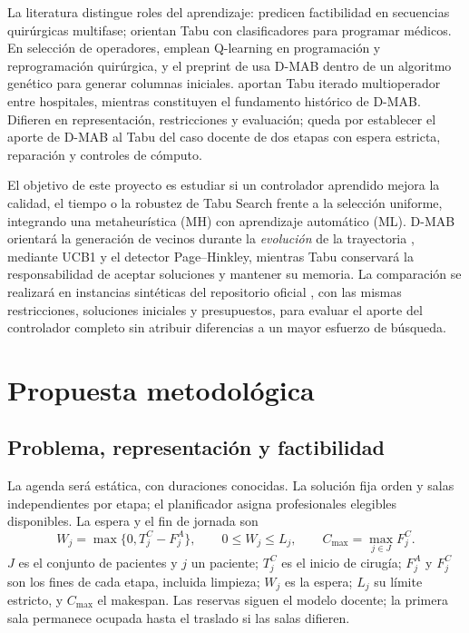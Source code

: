 \documentclass[12pt,letterpaper]{report}
\begin{document}
La literatura distingue roles del aprendizaje: \textcite{akbarzadeh2024}
predicen factibilidad en secuencias quirúrgicas multifase;
\textcite{niroumandrad2024} orientan Tabu con clasificadores para programar
médicos. En selección de operadores, \textcite{yu2024} emplean Q-learning
en programación y reprogramación quirúrgica, y el preprint de
\textcite{dolatkhah2026} usa D-MAB dentro de un algoritmo genético para
generar columnas iniciales. \textcite{yin2026} aportan Tabu iterado
multioperador entre hospitales, mientras \textcite{dacosta2008} constituyen
el fundamento histórico de D-MAB. Difieren en representación, restricciones
y evaluación; queda por establecer el aporte de D-MAB al Tabu del caso
docente de dos etapas con espera estricta, reparación y controles de cómputo.

El objetivo de este proyecto es estudiar si un controlador aprendido mejora
la calidad, el tiempo o la robustez de Tabu Search frente a la selección
uniforme, integrando una metaheurística (MH) con aprendizaje automático (ML).
D-MAB orientará la generación de vecinos durante la \emph{evolución} de la
trayectoria \parencite{vega_taxonomia}, mediante UCB1 y el detector
Page--Hinkley, mientras Tabu conservará la responsabilidad de aceptar
soluciones y mantener su memoria. La comparación se realizará en instancias
sintéticas del repositorio oficial \parencite{saicooh2026}, con las mismas
restricciones, soluciones iniciales y presupuestos, para evaluar el aporte
del controlador completo sin atribuir diferencias a un mayor esfuerzo de
búsqueda.

\clearpage
\section{Propuesta metodológica}
\subsection{Problema, representación y factibilidad}
La agenda será estática, con duraciones conocidas. La solución fija orden
y salas independientes por etapa; el planificador asigna profesionales
elegibles disponibles. La espera y el fin de jornada son
\begin{equation}
 W_j=\max\{0,T_j^C-F_j^A\},\qquad 0\leq W_j\leq L_j,
 \qquad C_{\max}=\max_{j\in J}F_j^C.
 \label{eq:restricciones}
\end{equation}
\noindent $J$ es el conjunto de pacientes y $j$ un paciente; $T_j^C$ es el
inicio de cirugía; $F_j^A$ y $F_j^C$ son los fines de cada etapa, incluida
limpieza; $W_j$ es la espera; $L_j$ su límite estricto, y $C_{\max}$ el
makespan. Las reservas siguen el modelo docente; la primera sala permanece
ocupada hasta el traslado si las salas difieren.
\end{document}
